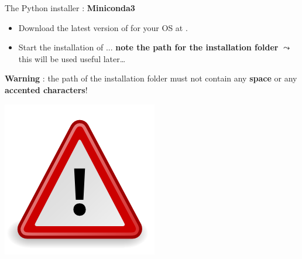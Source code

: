 \documentclass[10pt,serif,mathserif,compress,hyperref={colorlinks}]{beamer}
\begin{document}
\begin{frame}{The Python installer : {\bf Miniconda3}}
  
  \begin{tcolorbox}[title=Installation of Miniconda3]

    \begin{itemize}
      
    \item Download the latest version of  for your OS at \href{https://docs.conda.io/en/latest/miniconda.html}{}.\\
      
     \item Start the installation of ... \textbf{note the path for the installation folder } $\leadsto$ this will be used useful later\ldots\\[1mm]
    \end{itemize}
    
  \end{tcolorbox}

  \vfill
\hspace*{-20pt}\textbf{Warning} : the path of the installation folder  must not contain any {\bf space} or any {\bf accented characters}!
  
  \begin{minipage}{.15\linewidth}
    \hspace*{-20pt}\includegraphics[width=1.\linewidth]{images/dialog-warning-2.png} 
  \end{minipage}%
  \begin{minipage}{.85\linewidth}
    

\end{minipage}
\end{frame}
\end{document}
